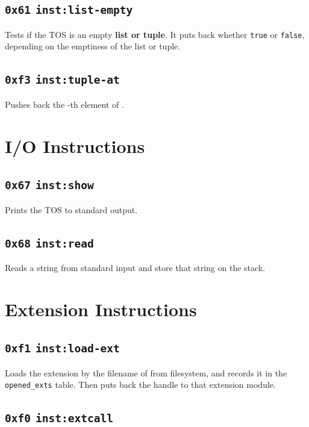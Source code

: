 \documentclass{report}
\newcommand{\inst}[1] {\texttt{inst:#1}}
\begin{document}
\subsection{\texttt{0x61} \inst{list-empty} }

Tests if the TOS is an empty \textbf{list or tuple}. It puts back whether \texttt{true} or \texttt{false}, depending on the emptiness of the list or tuple.

\subsection{\texttt{0xf3} \inst{tuple-at}  }

Pushes back the -th element of .

\section{I/O Instructions}

\subsection{\texttt{0x67} \inst{show} }

Prints the TOS to standard output.

\subsection{\texttt{0x68} \inst{read}}

Reads a string from standard input and store that string on the stack.

\section{Extension Instructions}

\subsection{\texttt{0xf1} \inst{load-ext} }

Loads the extension by the filename of  from filesystem, and records it in the \texttt{opened\_exts} table. Then puts back the handle to that extension module.

\subsection{\texttt{0xf0} \inst{extcall}  }
\end{document}
